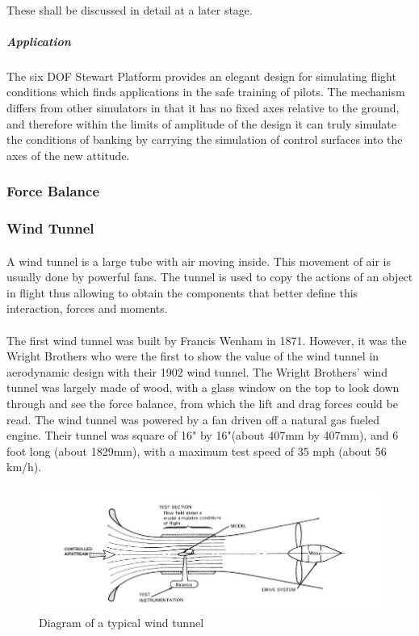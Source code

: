 \paragraph{}These shall be discussed in detail at a later stage.

\subparagraph{Application}
\paragraph{}The six DOF Stewart Platform provides an elegant design for simulating flight conditions which finds applications in the safe training of pilots. The mechanism differs from other simulators in that it has no fixed axes relative to the ground, and therefore within the limits of amplitude of the design it can truly simulate the conditions of banking by carrying the simulation of control surfaces into the axes of the new attitude.

\subsubsection{Force Balance}
\subsubsection{Wind Tunnel}
\paragraph{}
A wind tunnel is a large tube with air moving inside. This movement of air is usually done by powerful fans. The tunnel is used to copy the actions of an object in flight thus allowing
to obtain the components that better define this interaction, forces and moments.

\paragraph{} The first wind tunnel was built by
Francis Wenham in 1871. However, it was the Wright Brothers who were the first to show the value of the wind tunnel in aerodynamic design with their 1902 wind tunnel.  The Wright Brothers’ wind tunnel was largely made of wood, with a glass window on the top to look down through and see the force balance, from which the
lift and drag forces could be read. The wind tunnel was powered by a fan driven off a natural gas fueled engine. Their tunnel was square of 16" by 16"(about 407mm by 407mm), and 6 foot long (about 1829mm), with a maximum test speed of 35 mph (about 56 km/h).
\begin{center}
	\begin{figure}[!h]
	\centering
	\includegraphics{Figures/Fig2}
	\caption{Diagram of a typical wind tunnel}
	\end{figure}
\end{center}
